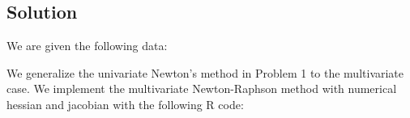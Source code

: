 \documentclass[
]{article}
\newenvironment{Shaded}{\begin{snugshade}}{\end{snugshade}}
\newcommand{\AttributeTok}[1]{\textcolor[rgb]{0.13,0.29,0.53}{#1}}
\newcommand{\ControlFlowTok}[1]{\textcolor[rgb]{0.13,0.29,0.53}{\textbf{#1}}}
\newcommand{\DecValTok}[1]{\textcolor[rgb]{0.00,0.00,0.81}{#1}}
\newcommand{\FunctionTok}[1]{\textcolor[rgb]{0.13,0.29,0.53}{\textbf{#1}}}
\newcommand{\NormalTok}[1]{#1}
\newcommand{\OtherTok}[1]{\textcolor[rgb]{0.56,0.35,0.01}{#1}}
\newcommand{\SpecialCharTok}[1]{\textcolor[rgb]{0.81,0.36,0.00}{\textbf{#1}}}
\newcommand{\StringTok}[1]{\textcolor[rgb]{0.31,0.60,0.02}{#1}}
\begin{document}
\hypertarget{solution}{%
\subsection{Solution}\label{solution}}

We are given the following data:

\begin{Shaded}
\end{Shaded}

We generalize the univariate Newton's method in Problem 1 to the
multivariate case. We implement the multivariate Newton-Raphson method
with numerical hessian and jacobian with the following R code:
\end{document}
